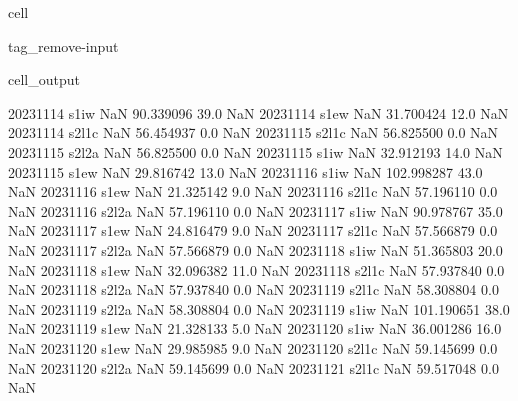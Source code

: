 \documentclass[letterpaper,10pt,english]{jupyterBook}
\begin{document}
\begin{sphinxuseclass}{cell}
\begin{sphinxuseclass}{tag_remove-input}
\begin{sphinxVerbatimOutput}
\begin{sphinxuseclass}{cell_output}
\begin{sphinxVerbatim}[commandchars=\\\{\}]
2023\PYGZhy{}11\PYGZhy{}14        s1\PYGZus{}iw           NaN   90.339096    39.0         NaN
2023\PYGZhy{}11\PYGZhy{}14        s1\PYGZus{}ew           NaN   31.700424    12.0         NaN
2023\PYGZhy{}11\PYGZhy{}14       s2\PYGZus{}l1c           NaN   56.454937     0.0         NaN
2023\PYGZhy{}11\PYGZhy{}15       s2\PYGZus{}l1c           NaN   56.825500     0.0         NaN
2023\PYGZhy{}11\PYGZhy{}15       s2\PYGZus{}l2a           NaN   56.825500     0.0         NaN
2023\PYGZhy{}11\PYGZhy{}15        s1\PYGZus{}iw           NaN   32.912193    14.0         NaN
2023\PYGZhy{}11\PYGZhy{}15        s1\PYGZus{}ew           NaN   29.816742    13.0         NaN
2023\PYGZhy{}11\PYGZhy{}16        s1\PYGZus{}iw           NaN  102.998287    43.0         NaN
2023\PYGZhy{}11\PYGZhy{}16        s1\PYGZus{}ew           NaN   21.325142     9.0         NaN
2023\PYGZhy{}11\PYGZhy{}16       s2\PYGZus{}l1c           NaN   57.196110     0.0         NaN
2023\PYGZhy{}11\PYGZhy{}16       s2\PYGZus{}l2a           NaN   57.196110     0.0         NaN
2023\PYGZhy{}11\PYGZhy{}17        s1\PYGZus{}iw           NaN   90.978767    35.0         NaN
2023\PYGZhy{}11\PYGZhy{}17        s1\PYGZus{}ew           NaN   24.816479     9.0         NaN
2023\PYGZhy{}11\PYGZhy{}17       s2\PYGZus{}l1c           NaN   57.566879     0.0         NaN
2023\PYGZhy{}11\PYGZhy{}17       s2\PYGZus{}l2a           NaN   57.566879     0.0         NaN
2023\PYGZhy{}11\PYGZhy{}18        s1\PYGZus{}iw           NaN   51.365803    20.0         NaN
2023\PYGZhy{}11\PYGZhy{}18        s1\PYGZus{}ew           NaN   32.096382    11.0         NaN
2023\PYGZhy{}11\PYGZhy{}18       s2\PYGZus{}l1c           NaN   57.937840     0.0         NaN
2023\PYGZhy{}11\PYGZhy{}18       s2\PYGZus{}l2a           NaN   57.937840     0.0         NaN
2023\PYGZhy{}11\PYGZhy{}19       s2\PYGZus{}l1c           NaN   58.308804     0.0         NaN
2023\PYGZhy{}11\PYGZhy{}19       s2\PYGZus{}l2a           NaN   58.308804     0.0         NaN
2023\PYGZhy{}11\PYGZhy{}19        s1\PYGZus{}iw           NaN  101.190651    38.0         NaN
2023\PYGZhy{}11\PYGZhy{}19        s1\PYGZus{}ew           NaN   21.328133     5.0         NaN
2023\PYGZhy{}11\PYGZhy{}20        s1\PYGZus{}iw           NaN   36.001286    16.0         NaN
2023\PYGZhy{}11\PYGZhy{}20        s1\PYGZus{}ew           NaN   29.985985     9.0         NaN
2023\PYGZhy{}11\PYGZhy{}20       s2\PYGZus{}l1c           NaN   59.145699     0.0         NaN
2023\PYGZhy{}11\PYGZhy{}20       s2\PYGZus{}l2a           NaN   59.145699     0.0         NaN
2023\PYGZhy{}11\PYGZhy{}21       s2\PYGZus{}l1c           NaN   59.517048     0.0         NaN

\end{sphinxVerbatim}
\end{sphinxuseclass}
\end{sphinxVerbatimOutput}
\end{sphinxuseclass}
\end{sphinxuseclass}
\end{document}
